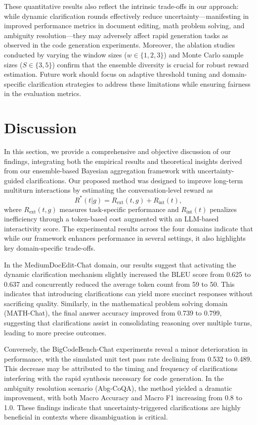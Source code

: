 \documentclass{article} %
\begin{document}
These quantitative results also reflect the intrinsic trade-offs in our approach: while dynamic clarification rounds effectively reduce uncertainty—manifesting in improved performance metrics in document editing, math problem solving, and ambiguity resolution—they may adversely affect rapid generation tasks as observed in the code generation experiments. Moreover, the ablation studies conducted by varying the window sizes (\(w \in \{1,2,3\}\)) and Monte Carlo sample sizes (\(S \in \{3,5\}\)) confirm that the ensemble diversity is crucial for robust reward estimation. Future work should focus on adaptive threshold tuning and domain-specific clarification strategies to address these limitations while ensuring fairness in the evaluation metrics.

\section{Discussion}
In this section, we provide a comprehensive and objective discussion of our findings, integrating both the empirical results and theoretical insights derived from our ensemble-based Bayesian aggregation framework with uncertainty-guided clarifications. Our proposed method was designed to improve long-term multiturn interactions by estimating the conversation-level reward as 
\[
R^*(t|g) = R_{\text{ext}}(t, g) + R_{\text{int}}(t),
\]
where \(R_{\text{ext}}(t, g)\) measures task-specific performance and \(R_{\text{int}}(t)\) penalizes inefficiency through a token-based cost augmented with an LLM-based interactivity score. The experimental results across the four domains indicate that while our framework enhances performance in several settings, it also highlights key domain-specific trade-offs.

In the MediumDocEdit-Chat domain, our results suggest that activating the dynamic clarification mechanism slightly increased the BLEU score from 0.625 to 0.637 and concurrently reduced the average token count from 59 to 50. This indicates that introducing clarifications can yield more succinct responses without sacrificing quality. Similarly, in the mathematical problem solving domain (MATH-Chat), the final answer accuracy improved from 0.739 to 0.799, suggesting that clarifications assist in consolidating reasoning over multiple turns, leading to more precise outcomes.

Conversely, the BigCodeBench-Chat experiments reveal a minor deterioration in performance, with the simulated unit test pass rate declining from 0.532 to 0.489. This decrease may be attributed to the timing and frequency of clarifications interfering with the rapid synthesis necessary for code generation. In the ambiguity resolution scenario (Abg-CoQA), the method yielded a dramatic improvement, with both Macro Accuracy and Macro F1 increasing from 0.8 to 1.0. These findings indicate that uncertainty-triggered clarifications are highly beneficial in contexts where disambiguation is critical.
\end{document}
